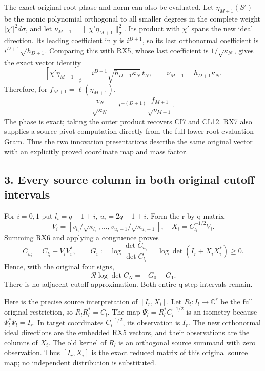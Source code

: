 \documentclass[11pt]{article}
\begin{document}
The exact original-root phase and norm can also be evaluated. Let \(\eta_{M+1}(S')\) be the monic polynomial orthogonal to all smaller degrees in the complete weight \(|\chi'|^2d\sigma\), and let \(\nu_{M+1}=\|\chi'\eta_{M+1}\|_\sigma^2\). Its product with \(\chi'\) spans the new ideal direction. Its leading coefficient in y is \(i^{D+1}\), so its last orthonormal coefficient is \(i^{D+1}\sqrt{h_{D+1}}\). Comparing this with RX5, whose last coefficient is \(1/\sqrt{\kappa_N}\), gives the exact vector identity \[
[\chi'\eta_{M+1}]_{\phi}
=i^{D+1}\sqrt{h_{D+1}\kappa_N}\,t_N,
\qquad
\boxed{\nu_{M+1}=h_{D+1}\kappa_N.}
\tag{RX7}
\] Therefore, for \(f_{M+1}=\ell(\eta_{M+1})\), \[
\boxed{\frac{v_N}{\sqrt{\kappa_N}}
=i^{-(D+1)}\frac{f_{M+1}}{\sqrt{\nu_{M+1}}}.}
\tag{RX8}
\] The phase is exact; taking the outer product recovers CI7 and CL12. RX7 also supplies a source-pivot computation directly from the full lower-root evaluation Gram. Thus the two innovation presentations describe the same original vector with an explicitly proved coordinate map and mass factor.

\subsection{3. Every source column in both original cutoff intervals}\label{every-source-column-in-both-original-cutoff-intervals}

For \(i=0,1\) put \(l_i=q-1+i\), \(u_i=2q-1+i\). Form the r-by-q matrix \[
V_i=[v_{l_i}/\sqrt{\kappa_{l_i}},\ldots,
v_{u_i-1}/\sqrt{\kappa_{u_i-1}}],
\quad X_i=C_{l_i}^{-1/2}V_i.
\tag{RX9}
\] Summing RX6 and applying a congruence proves \[
C_{u_i}=C_{l_i}+V_iV_i^*,\qquad
G_i:=\log\frac{\det C_{u_i}}{\det C_{l_i}}
=\log\det(I_r+X_iX_i^*)\ge0.
\tag{RX10}
\] Hence, with the original four signs, \[
\boxed{\mathcal R\log\det C_N=-G_0-G_1.}
\tag{RX11}
\] There is no adjacent-cutoff approximation. Both entire q-step intervals remain.

Here is the precise source interpretation of \([I_r,X_i]\). Let \(R_l:I_l\to\mathbb C^r\) be the full original restriction, so \(R_lR_l^*=C_l\). The map \(\Psi_l=R_l^*C_l^{-1/2}\) is an isometry because \(\Psi_l^*\Psi_l=I_r\). In target coordinates \(C_l^{-1/2}\), its observation is \(I_r\). The new orthonormal ideal directions are the embedded RX5 vectors, and their observations are the columns of \(X_i\). The old kernel of \(R_l\) is an orthogonal source summand with zero observation. Thus \([I_r,X_i]\) is the exact reduced matrix of this original source map; no independent distribution is substituted.
\end{document}
